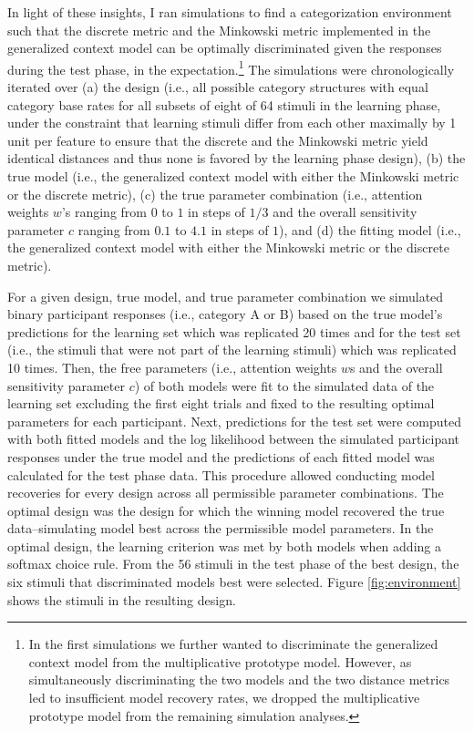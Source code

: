 \documentclass[a4paper,man,natbib]{apa6}
\begin{document}
In light of these insights, I ran simulations to find a categorization environment such that the discrete metric and the Minkowski metric implemented in the generalized context model can be optimally discriminated given the responses during the test phase, in the expectation.\footnote{In the first simulations we further wanted to discriminate the generalized context model from the multiplicative prototype model. However, as simultaneously discriminating the two models and the two distance metrics led to insufficient model recovery rates, we dropped the multiplicative prototype model from the remaining simulation analyses.} The simulations were chronologically iterated over (a) the design (i.e., all possible category structures with equal category base rates for all subsets of eight of 64 stimuli in the learning phase, under the constraint that learning stimuli differ from each other maximally by 1 unit per feature to ensure that the discrete and the Minkowski metric yield identical distances and thus none is favored by the learning phase design), (b) the true model (i.e., the generalized context model with either the Minkowski metric or the discrete metric), (c) the true parameter combination (i.e., attention weights $w$'s ranging from $0$ to $1$ in steps of $1/3$ and the overall sensitivity parameter $c$ ranging from $0.1$ to $4.1$ in steps of $1$), and (d) the fitting model (i.e., the generalized context model with either the Minkowski metric or the discrete metric).

For a given design, true model, and true parameter combination we simulated binary participant responses (i.e., category A or B) based on the true model's predictions for the learning set which was replicated 20 times and for the test set (i.e., the stimuli that were not part of the learning stimuli) which was replicated 10 times. Then, the free parameters (i.e., attention weights $w$s and the overall sensitivity parameter $c$) of both models were fit to the simulated data of the learning set excluding the first eight trials and fixed to the resulting optimal parameters for each participant. Next, predictions for the test set were computed with both fitted models and the log likelihood between the simulated participant responses under the true model and the predictions of each fitted model was calculated for the test phase data. This procedure allowed conducting model recoveries for every design across all permissible parameter combinations. The optimal design was the design for which the winning model recovered the true data--simulating model best across the permissible model parameters. In the optimal design, the learning criterion was met by both models when adding a softmax choice rule. From the 56 stimuli in the test phase of the best design, the six stimuli that discriminated models best were selected. Figure \ref{fig:environment} shows the stimuli in the resulting design.
\end{document}
